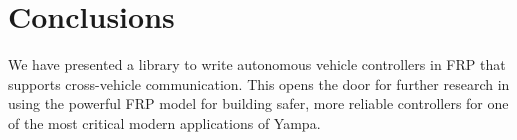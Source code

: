 \section{Conclusions}

We have presented a library to write autonomous vehicle controllers in FRP that supports cross-vehicle communication.
This opens the door for further research in using the powerful FRP model for building safer, more reliable controllers for one of the most critical modern applications of Yampa.


